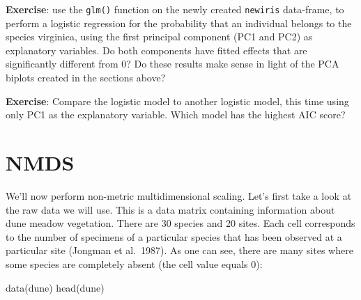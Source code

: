 \documentclass[
]{book}
\newenvironment{Shaded}{\begin{snugshade}}{\end{snugshade}}
\newcommand{\FunctionTok}[1]{\textcolor[rgb]{0.00,0.00,0.00}{#1}}
\newcommand{\NormalTok}[1]{#1}
\begin{document}
\textbf{Exercise}: use the \texttt{glm()} function on the newly created \texttt{newiris} data-frame, to perform a logistic regression for the probability that an individual belongs to the species virginica, using the first principal component (PC1 and PC2) as explanatory variables. Do both components have fitted effects that are significantly different from 0? Do these results make sense in light of the PCA biplots created in the sections above?

\textbf{Exercise}: Compare the logistic model to another logistic model, this time using only PC1 as the explanatory variable. Which model has the highest AIC score?

\hypertarget{nmds}{%
\section{NMDS}\label{nmds}}

We'll now perform non-metric multidimensional scaling. Let's first take a look at the raw data we will use. This is a data matrix containing information about dune meadow vegetation. There are 30 species and 20 sites. Each cell corresponds to the number of specimens of a particular species that has been observed at a particular site (Jongman et al.~1987). As one can see, there are many sites where some species are completely absent (the cell value equals 0):

\begin{Shaded}
\begin{Highlighting}[]
\FunctionTok{data}\NormalTok{(dune)}
\FunctionTok{head}\NormalTok{(dune)}
\end{Highlighting}
\end{Shaded}
\end{document}
